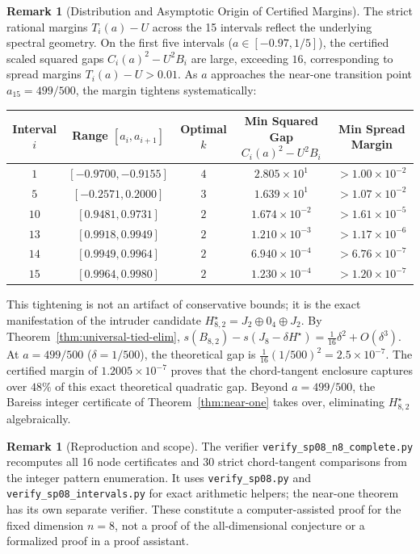 \documentclass[11pt,reqno]{article}
\theoremstyle{definition}
\newtheorem{remark}[theorem]{Remark}
\begin{document}
\begin{remark}[Distribution and Asymptotic Origin of Certified Margins]\label{rem:margins-asymptotic}
The strict rational margins $T_i(a) - U$ across the 15 intervals reflect the underlying spectral geometry. On the first five intervals ($a \in [-0.97, 1/5]$), the certified scaled squared gaps $C_i(a)^2 - U^2 B_i$ are large, exceeding $16$, corresponding to spread margins $T_i(a) - U > 0.01$. As $a$ approaches the near-one transition point $a_{15} = 499/500$, the margin tightens systematically:
\begin{center}
\small
\begin{tabular}{ccccc}
\hline
Interval $i$ & Range $[a_i, a_{i+1}]$ & Optimal $k$ & Min Squared Gap $C_i(a)^2 - U^2 B_i$ & Min Spread Margin \\
\hline
$1$ & $[-0.9700, -0.9155]$ & $4$ & $2.805 \times 10^{1}$ & $> 1.00 \times 10^{-2}$ \\
$5$ & $[-0.2571, 0.2000]$ & $3$ & $1.639 \times 10^{1}$ & $> 1.07 \times 10^{-2}$ \\
$10$ & $[0.9481, 0.9731]$ & $2$ & $1.674 \times 10^{-2}$ & $> 1.61 \times 10^{-5}$ \\
$13$ & $[0.9918, 0.9949]$ & $2$ & $1.210 \times 10^{-3}$ & $> 1.17 \times 10^{-6}$ \\
$14$ & $[0.9949, 0.9964]$ & $2$ & $6.940 \times 10^{-4}$ & $> 6.76 \times 10^{-7}$ \\
$15$ & $[0.9964, 0.9980]$ & $2$ & $1.230 \times 10^{-4}$ & $> 1.20 \times 10^{-7}$ \\
\hline
\end{tabular}
\end{center}
This tightening is not an artifact of conservative bounds; it is the exact manifestation of the intruder candidate $H^\star_{8, 2} = J_2 \oplus 0_4 \oplus J_2$. By Theorem~\ref{thm:universal-tied-elim}, $s(B_{8, 2}) - s(J_8 - \delta H^\star) = \frac{1}{16}\delta^2 + O(\delta^3)$. At $a = 499/500$ ($\delta = 1/500$), the theoretical gap is $\frac{1}{16}(1/500)^2 = 2.5 \times 10^{-7}$. The certified margin of $1.2005 \times 10^{-7}$ proves that the chord-tangent enclosure captures over $48\%$ of this exact theoretical quadratic gap. Beyond $a = 499/500$, the Bareiss integer certificate of Theorem~\ref{thm:near-one} takes over, eliminating $H^\star_{8, 2}$ algebraically.
\end{remark}

\begin{remark}[Reproduction and scope]
The verifier \texttt{verify\_sp08\_n8\_complete.py} recomputes all 16 node
certificates and 30 strict chord-tangent comparisons from the integer
pattern enumeration. It uses \texttt{verify\_sp08.py} and
\texttt{verify\_sp08\_intervals.py} for exact arithmetic helpers; the
near-one theorem has its own separate verifier. These constitute a
computer-assisted proof for the fixed dimension $n=8$, not a proof of
the all-dimensional conjecture or a formalized proof in a proof assistant.
\end{remark}
\end{document}
